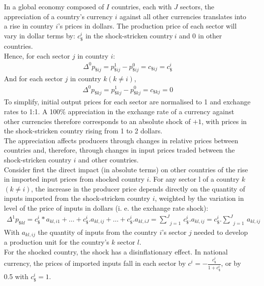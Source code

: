 \documentclass[11pt,a4paper]{article}
\begin{document}
In a global economy composed of $I$ countries, each with $J$ sectors, the appreciation of a country's currency $i$ against all other currencies translates into a rise in country $i$'s prices in dollars. The production price of each sector will vary in dollar terms by: $c_\$^i$ in the shock-stricken country$~i$ and 0 in other countries. \\
Hence, for each sector $j$ in country $i$:
\begin{eqnarray*}
 {{\Delta }^{0}}p_{\${ij}}=p_{\${ij}}^{1}-p_{\${ij}}^{0}=c_{\${ij}}=c_{\$}^i
  \end{eqnarray*}	
And for each sector $j$ in country $k (k\ne i)$,
\begin{eqnarray*}
 {{\Delta }^{0}}p_{\${kj}}=p_{\${kj}}^{1}-p_{\${kj}}^{0}=c_{\${kj}}=0
 \end{eqnarray*}	
To simplify, initial output prices for each sector are normalised to 1 and exchange rates to 1:1. 
A 100$\%$ appreciation in the exchange rate of a currency against other currencies therefore corresponds to an absolute shock of $+1$, with prices in the shock-stricken country rising from 1 to 2 dollars.\\
The appreciation affects producers through changes in relative prices between countries and, therefore, through changes in input prices traded between the shock-stricken country $i$ and other countries. \\
Consider first the direct impact (in absolute terms) on other countries of the rise in imported input prices from shocked country $i$. For any sector l of a country $k$ $(k\ne i)$, the increase in the producer price depends directly on the quantity of inputs imported from the shock-stricken country $i$, weighted by the variation in level of the price of inputs in dollars (i. e. the exchange rate shock):\\
\begin{eqnarray}
\Delta ^1 p_{\${kl}}=c_\$^i*a_{kl,i1}+\ldots+c_\$^i.a_{kl,ij}+\ldots+c_\$^i.a_{kl,iJ}=\underset{j=1}{\overset{J}{\mathop\sum}}\,c_\$^i.a_{kl,ij}=c_\$^i.\underset{j=1}{\overset{J}{\mathop\sum}}\,a_{kl,ij}  
\label{eq:eq1} 
\end{eqnarray}
With $a_{kl,ij}$ the quantity of inputs from the country $i$'s sector $j$ needed to develop a production unit for the country's $k$ sector $l$. \\
For the shocked country, the shock has a disinflationary effect. In national currency, the prices of imported inputs fall in each sector by $c^i=-\frac{c_\$^i}{1+{c_\$^i}}$, or by 0.5 with $c_\$^i=1$. \\
\end{document}
